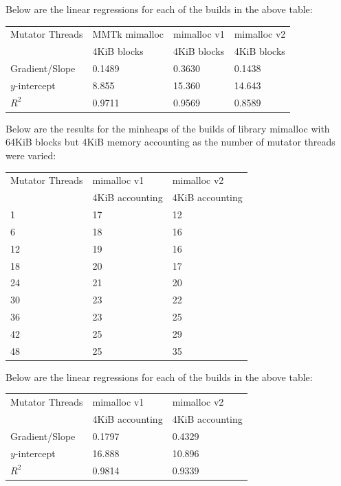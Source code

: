 \documentclass{article}
\begin{document}
Below are the linear regressions for each of the builds in the above table:
\begin{center}
    \begin{tabular}{|l|l|l|l|}
        \hline
        Mutator Threads & MMTk mimalloc & mimalloc v1 & mimalloc v2\\
        & 4KiB blocks & 4KiB blocks & 4KiB blocks\\
        \hline
        Gradient/Slope & 0.1489 & 0.3630 & 0.1438\\
        \hline
        $y$-intercept & 8.855 & 15.360 & 14.643\\
        \hline
        $R^2$ & 0.9711 & 0.9569 & 0.8589\\
        \hline
    \end{tabular}
\end{center}

Below are the results for the minheaps of the builds of library mimalloc with 64KiB blocks but 4KiB memory accounting as the number of mutator threads were varied:
\begin{center}
    \begin{tabular}{|l|l|l|}
        \hline
        Mutator Threads & mimalloc v1 & mimalloc v2\\
        & 4KiB accounting & 4KiB accounting\\
        \hline
        1 & 17 & 12\\
        \hline
        6 & 18 & 16\\
        \hline
        12 & 19 & 16\\
        \hline
        18 & 20 & 17\\
        \hline
        24 & 21 & 20\\
        \hline
        30 & 23 & 22\\
        \hline
        36 & 23 & 25\\
        \hline
        42 & 25 & 29\\
        \hline
        48 & 25 & 35\\
        \hline
    \end{tabular}
\end{center}

Below are the linear regressions for each of the builds in the above table:
\begin{center}
    \begin{tabular}{|l|l|l|}
        \hline
        Mutator Threads & mimalloc v1 & mimalloc v2\\
        & 4KiB accounting & 4KiB accounting\\
        \hline
        Gradient/Slope & 0.1797 & 0.4329\\
        \hline
        $y$-intercept & 16.888 & 10.896\\
        \hline
        $R^2$ & 0.9814 & 0.9339\\
        \hline
    \end{tabular}
\end{center}
\end{document}
